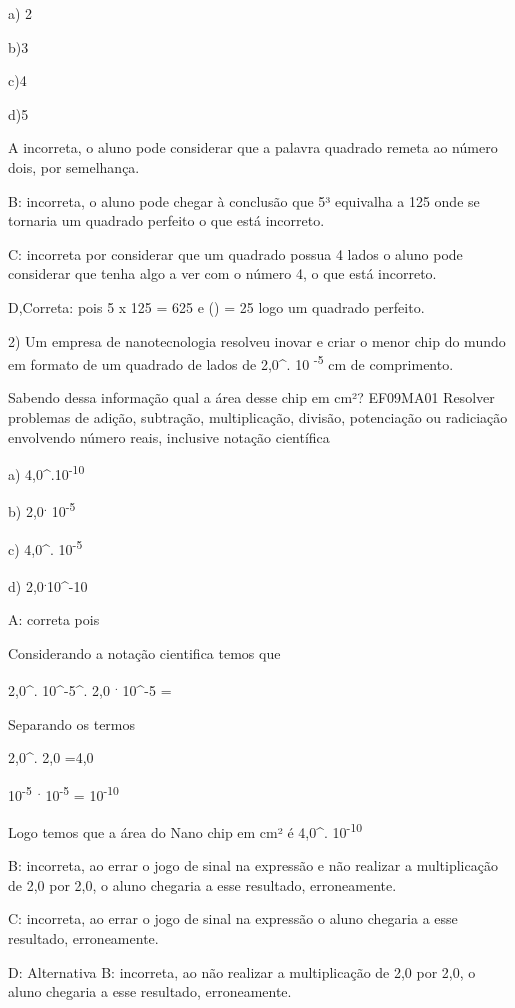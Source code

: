 a) 2

b)3

c)4

d)5

A incorreta, o aluno pode considerar que a palavra quadrado remeta ao
número dois, por semelhança.

B: incorreta, o aluno pode chegar à conclusão que 5³ equivalha a 125
onde se tornaria um quadrado perfeito o que está incorreto.

C: incorreta por considerar que um quadrado possua 4 lados o aluno pode
considerar que tenha algo a ver com o número 4, o que está incorreto.

D,Correta: pois 5 x 125 = 625 e () = 25 logo um quadrado
perfeito.

2) Um empresa de nanotecnologia resolveu inovar e criar o menor chip do
mundo em formato de um quadrado de lados de 2,0^{.} 10
\textsuperscript{-5} cm de comprimento.

Sabendo dessa informação qual a área desse chip em cm²? EF09MA01
Resolver problemas de adição, subtração, multiplicação, divisão,
potenciação ou radiciação envolvendo número reais, inclusive notação
científica

a) 4,0^{.}10\textsuperscript{-10}

b) 2,0\textsuperscript{.} 10\textsuperscript{-5}

c) 4,0^{.} 10\textsuperscript{-5}

d) 2,0\textsuperscript{.}10^{-10}

A: correta pois

Considerando a notação cientifica temos que

2,0^{.} 10^{-5}^{.} 2,0
\textsuperscript{.} 10^{-5} =

Separando os termos

2,0^{.} 2,0 =4,0

10\textsuperscript{-5~.} 10\textsuperscript{-5} =
10\textsuperscript{-10}

Logo temos que a área do Nano chip em cm² é 4,0^{.}
10\textsuperscript{-10}

B: incorreta, ao errar o jogo de sinal na expressão e não realizar a
multiplicação de 2,0 por 2,0, o aluno chegaria a esse resultado,
erroneamente.

C: incorreta, ao errar o jogo de sinal na expressão o aluno chegaria a
esse resultado, erroneamente.

D: Alternativa B: incorreta, ao não realizar a multiplicação de 2,0 por
2,0, o aluno chegaria a esse resultado, erroneamente.


